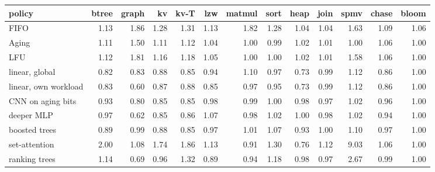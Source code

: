 \begin{tabular}{lrrrrrrrrrrrr}
\toprule
policy & btree & graph & kv & kv-T & lzw & matmul & sort & heap & join & spmv & chase & bloom \\
\midrule
FIFO & 1.13 & 1.86 & 1.28 & 1.31 & 1.13 & 1.82 & 1.28 & 1.04 & 1.04 & 1.63 & 1.09 & 1.06 \\
Aging & 1.11 & 1.50 & 1.11 & 1.12 & 1.04 & 1.00 & 0.99 & 1.02 & 1.01 & 1.00 & 1.06 & 1.00 \\
LFU & 1.12 & 1.81 & 1.16 & 1.18 & 1.05 & 1.00 & 1.00 & 1.02 & 1.01 & 1.58 & 1.06 & 1.00 \\
linear, global & 0.82 & 0.83 & 0.88 & 0.85 & 0.94 & 1.10 & 0.97 & 0.73 & 0.99 & 1.12 & 0.86 & 1.00 \\
linear, own workload & 0.83 & 0.60 & 0.87 & 0.88 & 0.85 & 0.97 & 0.95 & 0.73 & 0.99 & 1.12 & 0.86 & 1.00 \\
CNN on aging bits & 0.93 & 0.80 & 0.85 & 0.85 & 0.98 & 0.99 & 1.00 & 0.98 & 0.97 & 1.02 & 0.96 & 1.00 \\
deeper MLP & 0.97 & 0.62 & 0.85 & 0.86 & 1.07 & 0.98 & 1.02 & 1.00 & 0.98 & 1.02 & 0.94 & 1.00 \\
boosted trees & 0.89 & 0.99 & 0.88 & 0.85 & 0.97 & 1.01 & 1.07 & 0.93 & 1.00 & 1.10 & 0.97 & 1.00 \\
set-attention & 2.00 & 1.08 & 1.74 & 1.86 & 1.13 & 0.91 & 1.30 & 0.76 & 1.12 & 9.03 & 1.06 & 1.00 \\
ranking trees & 1.14 & 0.69 & 0.96 & 1.32 & 0.89 & 0.94 & 1.18 & 0.98 & 0.97 & 2.67 & 0.99 & 1.00 \\
\bottomrule
\end{tabular}
